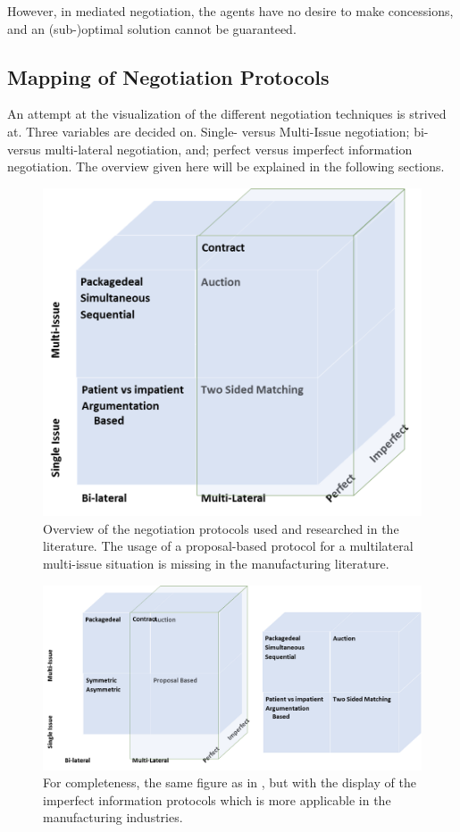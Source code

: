 However, in mediated negotiation, the agents have no desire to make concessions, and an (sub-)optimal solution cannot be guaranteed.

\subsection{Mapping of Negotiation Protocols}
An attempt at the visualization of the different negotiation techniques is strived at. Three variables are decided on. Single- versus Multi-Issue negotiation; bi- versus multi-lateral negotiation, and; perfect versus imperfect information negotiation. The overview given here will be explained in the following sections.
\begin{figure}[h]
	\centering
	\includegraphics[width=0.7\linewidth]{img/mapping_nego}
	\caption{Overview of the negotiation protocols used and researched in the literature. The usage of a proposal-based protocol for a multilateral multi-issue situation is missing in the manufacturing literature.}
	\label{fig:mapping_nego}
\end{figure}


\begin{figure}[h]
	\centering
	\includegraphics[width=0.9\linewidth]{img/mapping_nego2}
	\caption{For completeness, the same figure as in , but with the display of the imperfect information protocols which is more applicable in the manufacturing industries.}
	\label{fig:mapping_nego2}
\end{figure}

